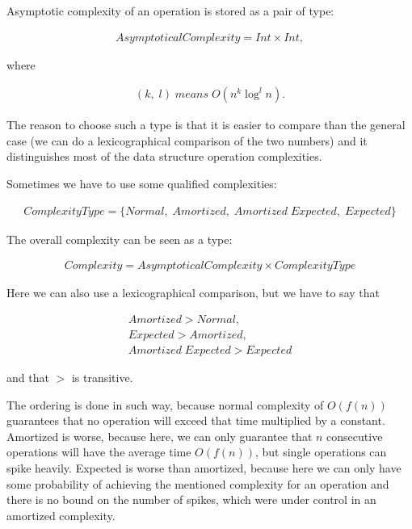 \documentclass[a4paper,11pt]{article}
\begin{document}
		Asymptotic complexity of an operation is stored as a pair of type:

		\begin{eqnarray}
			AsymptoticalComplexity = Int \times Int,
		\end{eqnarray}

		where

		\begin{eqnarray} \label{eqn:linlog}
			(k, \; l) \; means \; O(n^k \log^l{ n}).
		\end{eqnarray}

		The reason to choose such a type is that it is easier to compare than the general case (we can do a
		lexicographical comparison of the two numbers) and it distinguishes most of the data structure operation
		complexities.

		Sometimes we have to use some qualified complexities:

		\begin{eqnarray}
			ComplexityType = \{ Normal, \; Amortized, \; Amortized \;Expected, \; Expected \}
		\end{eqnarray}

		The overall complexity can be seen as a type:

		\begin{eqnarray}
			Complexity = AsymptoticalComplexity \times ComplexityType
		\end{eqnarray}

		Here we can also use a lexicographical comparison, but we have to say that

		\begin{eqnarray}
			Amortized > Normal,\\
			Expected > Amortized,\\
			Amortized \; Expected > Expected
		\end{eqnarray}

		and that $>$ is transitive.

		The ordering is done in such way, because normal complexity of $O(f(n))$ guarantees that no operation
		will exceed that time multiplied by a constant. Amortized is worse, because here, we can only guarantee
		that $n$ consecutive operations will have the average time $O(f(n))$, but single operations can spike
		heavily. Expected is worse than amortized, because here we can only have some probability of achieving
		the mentioned complexity for an operation and there is no bound on the number of spikes, which were under
		control in an amortized complexity.
\end{document}
